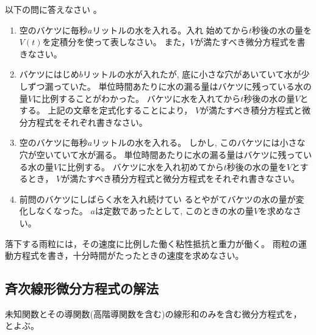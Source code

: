\documentclass[twocolumn,11pt]{jarticle}
\begin{document}
\nquestion
以下の問に答えなさい
。
\begin{enumerate}
\item\label{item:bucket} 空のバケツに毎秒$a$リットルの水を入れる。入れ
  始めてから$t$秒後の水の量を$V(t)$を定積分を使って表しなさい。
  また，$V$が満たすべき微分方程式を書きなさい。
\item\label{item:bucket-hole} バケツにはじめ$b$リットルの水が入れたが,
  底に小さな穴があいていて水が少しずつ漏っていた。
  単位時間あたりに水の漏る量はバケツに残っている水の量$V$に比例することがわかった。
  バケツに水を入れてから$t$秒後の水の量$V$とする。
  上記の文章を定式化することにより，
  $V$が満たすべき積分方程式と微分方程式をそれぞれ書きなさい。
\item\label{item:bucket-in-out}
  空のバケツに毎秒$a$リットルの水を入れる。
  しかし, このバケツには小さな穴が空いていて水が漏る。
  単位時間あたりに水の漏る量はバケツに残っている水の量$V$に比例する。
  バケツに水を入れ初めてから$t$秒後の水の量を$V$とするとき，
  $V$が満たすべき積分方程式と微分方程式をそれぞれ書きなさい。
\item\label{item:bucket-final} 前問のバケツにしばらく水を入れ続けてい
  るとやがてバケツの水の量が変化しなくなった。
  $a$は定数であったとして, このときの水の量$V$を求めなさい。
\end{enumerate}

\nquestion
落下する雨粒には，その速度に比例した働く粘性抵抗と重力が働く。
雨粒の運動方程式を書き，十分時間がたったときの速度を求めなさい。

\subsection{斉次線形微分方程式の解法}

未知関数とその導関数(高階導関数を含む)の線形和のみを含む微分方程式を，
とよぶ。
\end{document}
